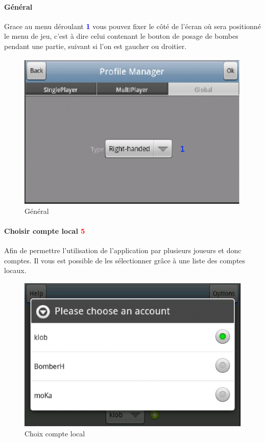 		
		\paragraph{Général\\}
		Grace au menu déroulant \textcolor{blue}{\textbf{1}} vous pouvez fixer le
		côté de l'écran où sera positionné le menu de jeu, c'est à dire celui contenant le bouton de posage de bombes pendant une
		partie, suivant si l'on est gaucher ou droitier. 
		\begin{figure}[h]
			\centering
				\includegraphics[scale=0.7]{Manuel/Img/7.eps}
				\caption{Général}
			\end{figure}
			
			
\paragraph{Choisir compte local \textcolor{red}{5}\\}
	Afin de permettre l'utilisation de l'application par plusieurs joueurs et donc
	comptes. Il vous est possible de les sélectionner grâce à une liste des comptes
	locaux. 
	\begin{figure}[h]
	\centering
		\includegraphics[scale=0.5]{Manuel/Img/8.eps}
		\caption{Choix compte local}
	\end{figure}

